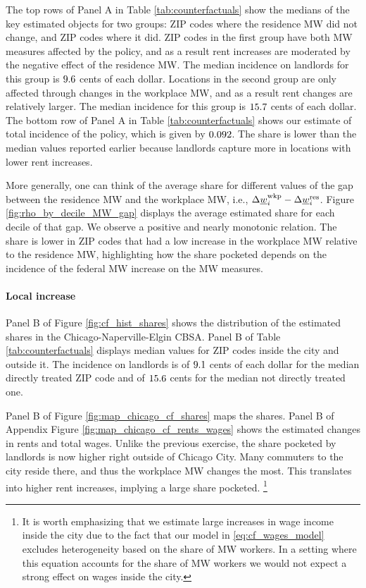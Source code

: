 The top rows of Panel A in Table \ref{tab:counterfactuals} show the medians of 
the key estimated objects for two groups:
ZIP codes where the residence MW did not change, and 
ZIP codes where it did.
ZIP codes in the first group have both MW measures affected by the policy,
and as a result rent increases are moderated by the negative effect of the 
residence MW.
The median incidence on landlords for this group is $\textnormal{9.6}$ 
cents of each dollar.
Locations in the second group are only affected through changes in the 
workplace MW, and as a result rent changes are relatively larger.
The median incidence for this group is $\textnormal{15.7}$ cents of each 
dollar.
The bottom row of Panel A in Table \ref{tab:counterfactuals} shows our estimate
of total incidence of the policy, which is given by $\textnormal{0.092}$.
The share is lower than the median values reported earlier because landlords 
capture more in locations with lower rent increases.

More generally, one can think of the average share for different values of the 
gap between the residence MW and the workplace MW, i.e., 
$\Delta \underline{w}_i^{\text{wkp}} - \Delta \underline{w}_i^{\text{res}}$.
Figure \ref{fig:rho_by_decile_MW_gap} displays the average estimated share for 
each decile of that gap.
We observe a positive and nearly monotonic relation.
The share is lower in ZIP codes that had a low increase in the workplace MW 
relative to the residence MW, highlighting how the share pocketed depends on
the incidence of the federal MW increase on the MW measures.

\paragraph{Local increase}

Panel B of Figure \ref{fig:cf_hist_shares} shows the distribution of the 
estimated shares in the Chicago-Naperville-Elgin CBSA.
Panel B of Table \ref{tab:counterfactuals} displays median values for ZIP codes
inside the city and outside it.
The incidence on landlords is of $\textnormal{9.1}$ cents of each 
dollar for the median directly treated ZIP code and of 
$\textnormal{15.6}$ cents for the median not directly treated one.

Panel B of Figure \ref{fig:map_chicago_cf_shares} maps the shares.
Panel B of Appendix Figure \ref{fig:map_chicago_cf_rents_wages} shows the 
estimated changes in rents and total wages.
Unlike the previous exercise, the share pocketed by landlords is now higher 
right outside of Chicago City.
Many commuters to the city reside there, and thus the workplace MW changes the 
most.
This translates into higher rent increases, implying a large share pocketed.%
\footnote{It is worth emphasizing that we estimate large increases in wage income
inside the city due to the fact that our model in \eqref{eq:cf_wages_model}
excludes heterogeneity based on the share of MW workers.
In a setting where this equation accounts for the share of MW workers we would 
not expect a strong effect on wages inside the city.} 

